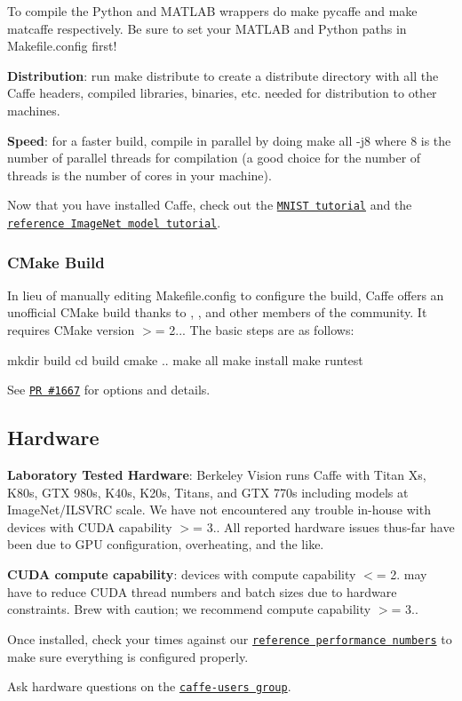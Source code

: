 To compile the Python and M\+A\+T\+L\+AB wrappers do {\ttfamily make pycaffe} and {\ttfamily make matcaffe} respectively. Be sure to set your M\+A\+T\+L\+AB and Python paths in {\ttfamily Makefile.\+config} first!

{\bfseries Distribution}\+: run {\ttfamily make distribute} to create a {\ttfamily distribute} directory with all the Caffe headers, compiled libraries, binaries, etc. needed for distribution to other machines.

{\bfseries Speed}\+: for a faster build, compile in parallel by doing {\ttfamily make all -\/j8} where 8 is the number of parallel threads for compilation (a good choice for the number of threads is the number of cores in your machine).

Now that you have installed Caffe, check out the \href{gathered/examples/mnist.html}{\tt M\+N\+I\+ST tutorial} and the \href{gathered/examples/imagenet.html}{\tt reference Image\+Net model tutorial}.

\subsubsection*{C\+Make Build}

In lieu of manually editing {\ttfamily Makefile.\+config} to configure the build, Caffe offers an unofficial C\+Make build thanks to , , and other members of the community. It requires C\+Make version $>$= 2... The basic steps are as follows\+: \begin{DoxyVerb}mkdir build
cd build
cmake ..
make all
make install
make runtest
\end{DoxyVerb}


See \href{https://github.com/BVLC/caffe/pull/1667}{\tt PR \#1667} for options and details.

\subsection*{Hardware}

{\bfseries Laboratory Tested Hardware}\+: Berkeley Vision runs Caffe with Titan Xs, K80s, G\+TX 980s, K40s, K20s, Titans, and G\+TX 770s including models at Image\+Net/\+I\+L\+S\+V\+RC scale. We have not encountered any trouble in-\/house with devices with C\+U\+DA capability $>$= 3.. All reported hardware issues thus-\/far have been due to G\+PU configuration, overheating, and the like.

{\bfseries C\+U\+DA compute capability}\+: devices with compute capability $<$= 2. may have to reduce C\+U\+DA thread numbers and batch sizes due to hardware constraints. Brew with caution; we recommend compute capability $>$= 3..

Once installed, check your times against our \href{performance_hardware.html}{\tt reference performance numbers} to make sure everything is configured properly.

Ask hardware questions on the \href{https://groups.google.com/forum/#!forum/caffe-users}{\tt caffe-\/users group}. 